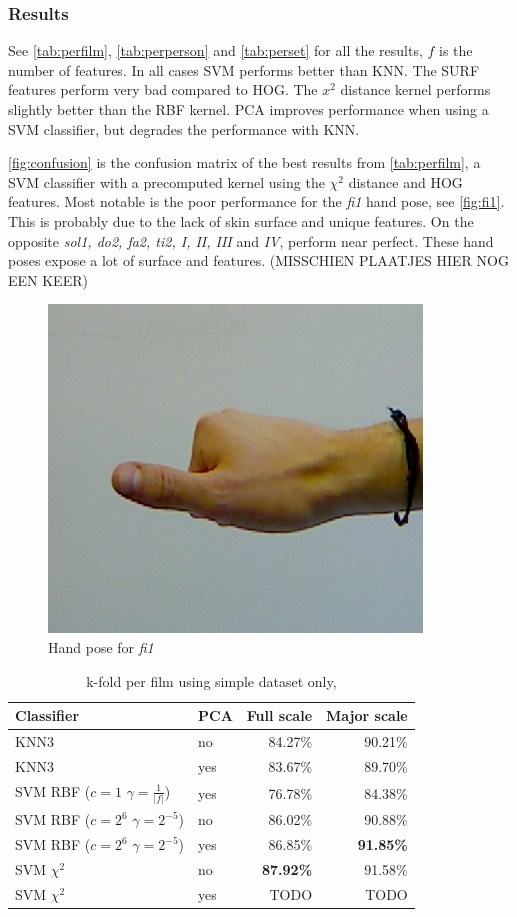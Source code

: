 \subsubsection{Results}
See \autoref{tab:perfilm}, \autoref{tab:perperson} and \autoref{tab:perset} for all the results, $f$ is the number of features. In all cases SVM performs better than KNN. The SURF features perform very bad compared to HOG. The $x^2$ distance kernel performs slightly better than the RBF kernel.  PCA improves performance when using a SVM classifier, but degrades the performance with KNN. 

\autoref{fig:confusion} is the confusion matrix of the best results from \autoref{tab:perfilm}, a SVM classifier with a precomputed kernel using the $\chi^2$ distance and HOG features. Most notable is the poor performance for the \emph{fi1} hand pose, see \autoref{fig:fi1}. This is probably due to the lack of skin surface and unique features. On the opposite \emph{sol1, do2, fa2, ti2, I, II, III }and \emph{IV}, perform near perfect. These hand poses expose a lot of surface and features. (MISSCHIEN PLAATJES HIER NOG EEN KEER)

\begin{figure}[tb]
  \centering
  \includegraphics[width=0.2\linewidth]{figures/examples/6.jpg}
  \caption{Hand pose for \emph{fi1}}
  \label{fig:fi1}
\end{figure}


\begin{table}
\centering
\begin{tabular}{llrr}
\hline\hline
Classifier 		& PCA		&  	Full scale	& Major scale	\\
\hline
KNN3 		&	no	&  	84.27\%		& 90.21\%		\\
KNN3	 	&	yes	& 	83.67\%		& 89.70\%		\\
SVM RBF ($c=1$ $\gamma=\frac{1}{|f|}$)	&	yes	& 	76.78\%	& 84.38\%	\\
SVM RBF ($c=2^6$ $\gamma=2^{-5}$)		&	no	&	86.02\%	& 90.88\% \\
SVM RBF ($c=2^6$ $\gamma=2^{-5}$)		&	yes	& 	86.85\% & \textbf{91.85\%} \\
SVM $\chi^2$ &	no	&	\textbf{87.92\%}		& 91.58\% \\
SVM $\chi^2$ &	yes	&	TODO		& TODO \\
\hline
\end{tabular}
\caption{k-fold per film using simple dataset only,}
\label{tab:perfilm}
\end{table}


